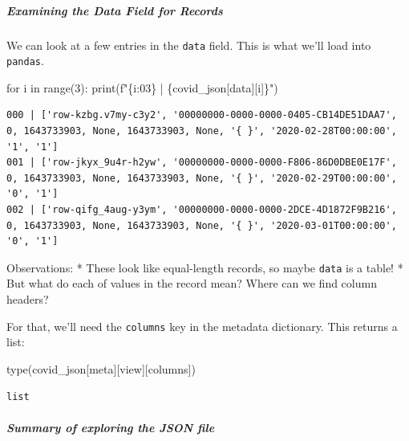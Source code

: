 \documentclass[
  letterpaper,
  DIV=11,
  numbers=noendperiod]{scrreprt}
\let\oldsubparagraph\subparagraph
\renewcommand{\subparagraph}[1]{\oldsubparagraph{#1}\mbox{}}
\newenvironment{Shaded}{\begin{snugshade}}{\end{snugshade}}
\newcommand{\BuiltInTok}[1]{\textcolor[rgb]{0.00,0.23,0.31}{#1}}
\newcommand{\ControlFlowTok}[1]{\textcolor[rgb]{0.00,0.23,0.31}{#1}}
\newcommand{\DecValTok}[1]{\textcolor[rgb]{0.68,0.00,0.00}{#1}}
\newcommand{\KeywordTok}[1]{\textcolor[rgb]{0.00,0.23,0.31}{#1}}
\newcommand{\NormalTok}[1]{\textcolor[rgb]{0.00,0.23,0.31}{#1}}
\newcommand{\SpecialCharTok}[1]{\textcolor[rgb]{0.37,0.37,0.37}{#1}}
\newcommand{\SpecialStringTok}[1]{\textcolor[rgb]{0.13,0.47,0.30}{#1}}
\newcommand{\StringTok}[1]{\textcolor[rgb]{0.13,0.47,0.30}{#1}}
\begin{document}
\subparagraph{Examining the Data Field for
Records}\label{examining-the-data-field-for-records}

We can look at a few entries in the \texttt{data} field. This is what
we'll load into \texttt{pandas}.

\begin{Shaded}
\begin{Highlighting}[]
\ControlFlowTok{for}\NormalTok{ i }\KeywordTok{in} \BuiltInTok{range}\NormalTok{(}\DecValTok{3}\NormalTok{):}
    \BuiltInTok{print}\NormalTok{(}\SpecialStringTok{f"}\SpecialCharTok{\{}\NormalTok{i}\SpecialCharTok{:03\}}\SpecialStringTok{ | }\SpecialCharTok{\{}\NormalTok{covid\_json[}\StringTok{\textquotesingle{}data\textquotesingle{}}\NormalTok{][i]}\SpecialCharTok{\}}\SpecialStringTok{"}\NormalTok{)}
\end{Highlighting}
\end{Shaded}

\begin{verbatim}
000 | ['row-kzbg.v7my-c3y2', '00000000-0000-0000-0405-CB14DE51DAA7', 0, 1643733903, None, 1643733903, None, '{ }', '2020-02-28T00:00:00', '1', '1']
001 | ['row-jkyx_9u4r-h2yw', '00000000-0000-0000-F806-86D0DBE0E17F', 0, 1643733903, None, 1643733903, None, '{ }', '2020-02-29T00:00:00', '0', '1']
002 | ['row-qifg_4aug-y3ym', '00000000-0000-0000-2DCE-4D1872F9B216', 0, 1643733903, None, 1643733903, None, '{ }', '2020-03-01T00:00:00', '0', '1']
\end{verbatim}

Observations: * These look like equal-length records, so maybe
\texttt{data} is a table! * But what do each of values in the record
mean? Where can we find column headers?

For that, we'll need the \texttt{columns} key in the metadata
dictionary. This returns a list:

\begin{Shaded}
\begin{Highlighting}[]
\BuiltInTok{type}\NormalTok{(covid\_json[}\StringTok{\textquotesingle{}meta\textquotesingle{}}\NormalTok{][}\StringTok{\textquotesingle{}view\textquotesingle{}}\NormalTok{][}\StringTok{\textquotesingle{}columns\textquotesingle{}}\NormalTok{])}
\end{Highlighting}
\end{Shaded}

\begin{verbatim}
list
\end{verbatim}

\subparagraph{Summary of exploring the JSON
file}\label{summary-of-exploring-the-json-file}
\end{document}
